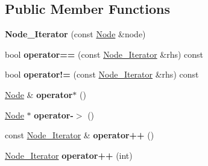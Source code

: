 \subsection*{Public Member Functions}
\begin{DoxyCompactItemize}
\item 
\hypertarget{classphys_1_1xml_1_1Node__Iterator_a0a84b41e91f1c141fd0696e63ad13342}{
{\bfseries Node\_\-Iterator} (const \hyperlink{classphys_1_1xml_1_1Node}{Node} \&node)}
\label{d5/d93/classphys_1_1xml_1_1Node__Iterator_a0a84b41e91f1c141fd0696e63ad13342}

\item 
\hypertarget{classphys_1_1xml_1_1Node__Iterator_a5aa3cfa9fa142c2c6a1632093e65d946}{
bool {\bfseries operator==} (const \hyperlink{classphys_1_1xml_1_1Node__Iterator}{Node\_\-Iterator} \&rhs) const }
\label{d5/d93/classphys_1_1xml_1_1Node__Iterator_a5aa3cfa9fa142c2c6a1632093e65d946}

\item 
\hypertarget{classphys_1_1xml_1_1Node__Iterator_a4fc75ede2796cc669bc57f8792c7768f}{
bool {\bfseries operator!=} (const \hyperlink{classphys_1_1xml_1_1Node__Iterator}{Node\_\-Iterator} \&rhs) const }
\label{d5/d93/classphys_1_1xml_1_1Node__Iterator_a4fc75ede2796cc669bc57f8792c7768f}

\item 
\hypertarget{classphys_1_1xml_1_1Node__Iterator_a7a41463192315ad62f663a8d8c6c541c}{
\hyperlink{classphys_1_1xml_1_1Node}{Node} \& {\bfseries operator$\ast$} ()}
\label{d5/d93/classphys_1_1xml_1_1Node__Iterator_a7a41463192315ad62f663a8d8c6c541c}

\item 
\hypertarget{classphys_1_1xml_1_1Node__Iterator_a3ef1d2e0de9ec33fb20281a8e10c9259}{
\hyperlink{classphys_1_1xml_1_1Node}{Node} $\ast$ {\bfseries operator-\/$>$} ()}
\label{d5/d93/classphys_1_1xml_1_1Node__Iterator_a3ef1d2e0de9ec33fb20281a8e10c9259}

\item 
\hypertarget{classphys_1_1xml_1_1Node__Iterator_a0fcba268fb43640570d76e4266e3420d}{
const \hyperlink{classphys_1_1xml_1_1Node__Iterator}{Node\_\-Iterator} \& {\bfseries operator++} ()}
\label{d5/d93/classphys_1_1xml_1_1Node__Iterator_a0fcba268fb43640570d76e4266e3420d}

\item 
\hypertarget{classphys_1_1xml_1_1Node__Iterator_a3cc108e65c83d05de94451f87cab6a73}{
\hyperlink{classphys_1_1xml_1_1Node__Iterator}{Node\_\-Iterator} {\bfseries operator++} (int)}
\label{d5/d93/classphys_1_1xml_1_1Node__Iterator_a3cc108e65c83d05de94451f87cab6a73}


\end{DoxyCompactItemize}
